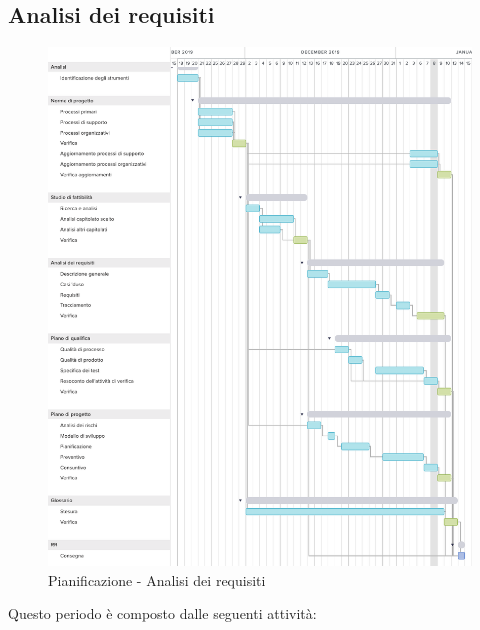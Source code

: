 \subsection{Analisi dei requisiti}
\begin{figure}[h!]
	\includegraphics[width=\textwidth]{res/img/g1113}
	\caption{Pianificazione - Analisi dei requisiti}
\end{figure}
Questo periodo è composto dalle seguenti attività:
